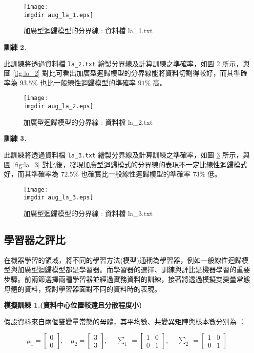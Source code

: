 \begin{figure}[H]
    \centering
        \texttt{[image: \\imgdir aug\_la\_1.eps]}
    \caption{加廣型迴歸模型的分界線 : 資料檔 la\_1.txt}
    \label{fig:aug_la_1}
\end{figure}

\textbf{\large 訓練 2.} 

此訓練將透過資料檔 \verb|la_2.txt| 繪製分界線及計算訓練之準確率，如圖 \ref{fig:aug_la_2} 所示，與圖 \ref{fig:la_2} 對比可看出加廣型迴歸模型的分界線能將資料切割得較好，而其準確率為 $93.5\%$ 也比一般線性迴歸模型的準確率 $91\%$ 高。

\begin{figure}[H]
    \centering
        \texttt{[image: \\imgdir aug\_la\_2.eps]}
    \caption{加廣型迴歸模型的分界線 : 資料檔 la\_2.txt}
    \label{fig:aug_la_2}
\end{figure}

\textbf{\large 訓練 3.} 

此訓練將透過資料檔 \verb|la_3.txt| 繪製分界線及計算訓練之準確率，如圖 \ref{fig:aug_la_3} 所示，與圖 \ref{fig:la_3} 對比後，發現加廣型迴歸模式的分界線的表現不一定比線性迴歸模式好，而其準確率為 $72.5\%$ 也確實比一般線性迴歸模型的準確率 $73\%$ 低。

\begin{figure}[H]
    \centering
        \texttt{[image: \\imgdir aug\_la\_3.eps]}
    \caption{加廣型迴歸模型的分界線 : 資料檔 la\_3.txt}
    \label{fig:aug_la_3}
\end{figure}
\subsection{學習器之評比}
在機器學習的領域，將不同的學習方法(模型)通稱為學習器，例如一般線性迴歸模型與加廣型迴歸模型都是學習器。而學習器的選擇、訓練與評比是機器學習的重要步驟。前兩節選擇兩種學習器並經過實務資料的訓練，接著將透過模擬雙變量常態母體的資料，探討學習器面對不同的資料時的表現。

\textbf{\large 模擬訓練 1.(資料中心位置較遠且分散程度小)}

假設資料來自兩個雙變量常態的母體，其平均數、共變異矩陣與樣本數分別為 ：

\[\mu_1 = \begin{bmatrix}
0 \\
0
\end{bmatrix}, \quad \mu_2 = \begin{bmatrix}
3 \\
3
\end{bmatrix}, \quad \begin{matrix} \sum_{1} \end{matrix} = \begin{bmatrix}
1 & 0\\
0 & 1
\end{bmatrix}, \quad \begin{matrix} \sum_{2} \end{matrix} = \begin{bmatrix}
1   & 0\\
0 & 1
\end{bmatrix}\]

